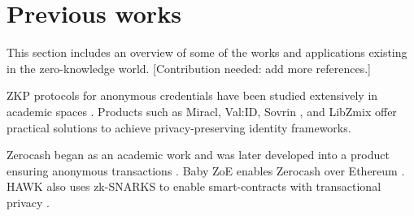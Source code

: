 \section{Previous works}
\label{apps:previous-works}

This section includes an overview of some of the works and applications existing in the zero-knowledge world. 
[Contribution needed: add more references.]


	ZKP protocols for anonymous credentials have been studied extensively in academic spaces 
\cite{2010:SCN:Solving-Revocation-with-Efficient-Update-of-Anonymous-Credentials,
			2014:architecture-for-ABC-technologies,
			2017:ccs:Practical-UC-Secure-Delegatable-Credentials-with-attributes,
			2017:SP:Accumulators-with-Applications-to-Anonymity-Preserving-Revocation,
			2018:NSDI:zkLedger}.  
Products such as Miracl, Val:ID, Sovrin \cite{2018:sovrin}, and LibZmix \cite{2019:github:libzmix} offer practical solutions to achieve privacy-preserving identity frameworks.  

Zerocash began as an academic work and was later developed into a product ensuring anonymous transactions \cite{2014:SP:Zerocash}. 
Baby ZoE enables Zerocash over Ethereum \cite{2018:github:baby-zoe}.
HAWK also uses zk-SNARKS to enable smart-contracts with transactional privacy \cite{2016:SP:Hawk}.
